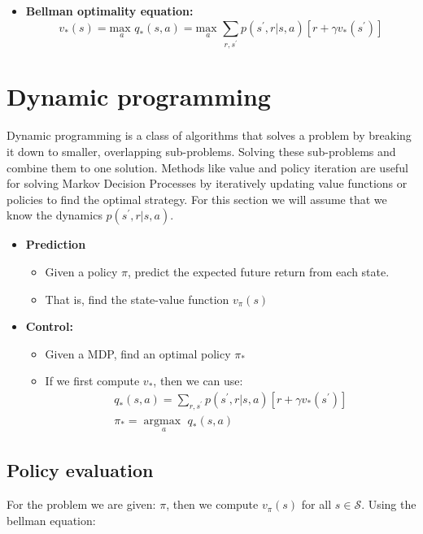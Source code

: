 \begin{wbox}{}
\begin{itemize}
	\item \textbf{Bellman optimality equation:}
	 \begin{equation}
	 v_*(s) = \underset{a}{\text{max }}q_*(s,a) = \underset{a}{\text{max }}\sum_{r, s^{\prime}}^{}p(s^{\prime},r|s,a)[r+\gamma v_*(s^{\prime})] 
	 \end{equation}
\end{itemize}
\end{wbox}

\section{Dynamic programming}
Dynamic programming is a class of algorithms that solves a problem by breaking it down to smaller, overlapping sub-problems. Solving these sub-problems and combine them to one solution. Methods like value and policy iteration are useful for solving Markov Decision Processes by iteratively updating value functions or policies to find the optimal strategy. For this section we will assume that we know the dynamics $p(s^{\prime},r|s,a)$. 

\begin{itemize}
	\item \textbf{Prediction} 
	\begin{itemize}
		\item Given a policy $\pi$, predict the expected future return from each state.
		\item That is, find the state-value function $v_\pi(s)$
	\end{itemize}
	\item \textbf{Control:}
	\begin{itemize}
		\item Given a MDP, find an optimal policy $\pi_*$
		\item If we first compute $v_*$, then we can use:
			\begin{equation}
			\begin{aligned}
				q_*(s,a) = \sum_{r, s^{\prime}}^{}p(s^{\prime},r|s,a)[r + \gamma v_*(s^{\prime})] \\
				\pi_* = \underset{a}{\arg \text{max } } q_*(s,a)
			\end{aligned}
			\end{equation}
	\end{itemize}
\end{itemize}


\subsection*{Policy evaluation}
For the problem we are given: $\pi$, then we compute $v_\pi(s)$ for all $s \in \mathcal{S}$. Using the bellman equation: 

